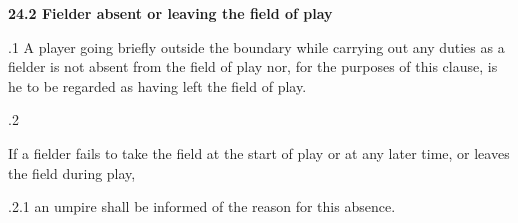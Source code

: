 \documentclass[12pt]{article}
\begin{document}
\vspace{\baselineskip}

\vspace{\baselineskip}

\vspace{\baselineskip}

\vspace{\baselineskip}

\vspace{\baselineskip}

\vspace{\baselineskip}

\vspace{\baselineskip}

\vspace{\baselineskip}
\begin{Center}
{\fontsize{8pt}{9.6pt}\par}
\end{Center}\par


\vspace{\baselineskip}
{\fontsize{11pt}{13.2pt}\selectfont \textbf{24.2 \tabto{0.47in} Fielder absent or leaving the field of play}\par}\par


\vspace{\baselineskip}
\begin{adjustwidth}{0.5in}{0.14in}
{\fontsize{9pt}{10.8pt}.1 \tabto{0.49in} A player going briefly outside the boundary while carrying out any duties as a fielder is not absent from the field of play nor, for the purposes of this clause, is he to be regarded as having left the field of play.\par}\par

\end{adjustwidth}


\vspace{\baselineskip}
{\fontsize{9pt}{10.8pt}.2 \tabto{0.49in} {\fontsize{8pt}{9.6pt}\selectfont If a fielder fails to take the field at the start of play or at any later time, or leaves the field during play,\par}\par}\par


\vspace{\baselineskip}
\begin{adjustwidth}{0.49in}{0.0in}
{\fontsize{9pt}{10.8pt}.2.1 \tabto{1.17in} an umpire shall be informed of the reason for this absence.\par}\par

\end{adjustwidth}
\end{document}
